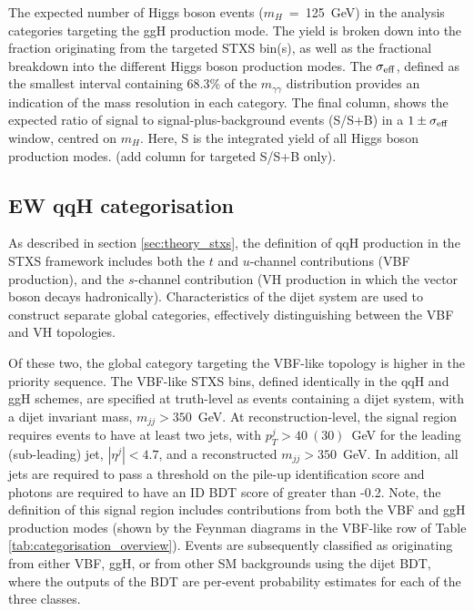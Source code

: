 \begin{table}[htb]
    \caption[Expected yields for the ggH production mode categories]{The expected number of Higgs boson events ($m_H$~=~125~GeV) in the analysis categories targeting the ggH production mode. The yield is broken down into the fraction originating from the targeted STXS bin(s), as well as the fractional breakdown into the different Higgs boson production modes. The $\sigma_{\rm{eff}}$, defined as the smallest interval containing 68.3\% of the $m_{\gamma\gamma}$ distribution provides an indication of the mass resolution in each category. The final column, shows the expected ratio of signal to signal-plus-background events (S/S+B) in a $1\pm\sigma_{\rm{eff}}$ window, centred on $m_H$. Here, S is the integrated yield of all Higgs boson production modes. (add column for targeted S/S+B only).}
    \label{tab:ggH_category_yields}
    \centering
    \scriptsize
    \renewcommand{\arraystretch}{1.3}
    \setlength{\tabcolsep}{2pt}
    
\end{table}

\FloatBarrier

\subsection{EW qqH categorisation}\label{sec:qqH_categorisation}
As described in section \ref{sec:theory_stxs}, the definition of qqH production in the STXS framework includes both the $t$ and $u$-channel contributions (VBF production), and the $s$-channel contribution (VH production in which the vector boson decays hadronically). Characteristics of the dijet system are used to construct separate global categories, effectively distinguishing between the VBF and VH topologies.

Of these two, the global category targeting the VBF-like topology is higher in the priority sequence. The VBF-like STXS bins, defined identically in the qqH and ggH schemes, are specified at truth-level as events containing a dijet system, with a dijet invariant mass, $m_{jj}>350$~GeV. At reconstruction-level, the signal region requires events to have at least two jets, with $p_T^{j}>40~(30)$~GeV for the leading (sub-leading) jet, $|\eta^j|<4.7$, and a reconstructed $m_{jj}>350$~GeV. In addition, all jets are required to pass a threshold on the pile-up identification score and photons are required to have an ID BDT score of greater than -0.2. Note, the definition of this signal region includes contributions from both the VBF and ggH production modes (shown by the Feynman diagrams in the VBF-like row of Table \ref{tab:categorisation_overview}). Events are subsequently classified as originating from either VBF, ggH, or from other SM backgrounds using the dijet BDT, where the outputs of the BDT are per-event probability estimates for each of the three classes. 


